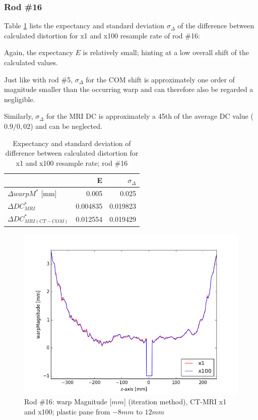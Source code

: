 \clearpage

\subsubsection{Rod \#16}

Table \ref{tab:Delta-resample_16} lists the expectancy and standard deviation $\sigma_\Delta$ of the difference between calculated distortion for x1 and x100 resample rate of rod \#16:

Again, the expectancy $E$ is relatively small; hinting at a low overall shift of the calculated values.

Just like with rod \#5, $\sigma_\Delta$ for the COM shift is approximately one order of magnitude smaller than the occurring warp and can therefore also be regarded a negligible.

Similarly, $\sigma_\Delta$ for the MRI DC is approximately a 45th of the average DC value ($0.9/0,02$) and can be neglected.

\begin{table}[!tbh]
\centering
\begin{tabular}{l|rr}
                    & E         & $\sigma_\Delta$   \\ \hline
$\Delta warpM^*$ [mm]  & 0.005     & 0.025    \\
$\Delta DC^*_{MRI}$         & 0.004835   & 0.019823  \\
$\Delta DC^*_{MRI(CT-COM)}$ & 0.012554   & 0.019429
\end{tabular}
\caption{Expectancy and standard deviation of difference between calculated distortion for x1 and x100 resample rate; rod \#16}
\label{tab:Delta-resample_16}
\end{table}

\begin{figure}[!tbh]
    \centering
    \includegraphics[scale=0.6]{../fig/python/ph3_v2/warp/ph3_MR_v2_x1-100_warpMagnitude_iter.png}
    \caption{Rod \#16: warp Magnitude [$mm$] (iteration method), CT-MRI x1 and x100; plastic pane from $-8mm$ to $12mm$}
    \label{fig:ph3_v2_warpMagnitude_x1-100}
\end{figure}

